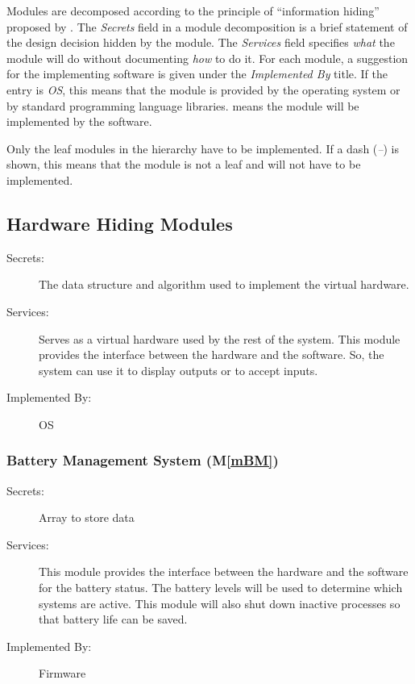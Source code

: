 \documentclass[12pt, titlepage]{article}
\newcommand{\mref}[1]{M\ref{#1}}
\begin{document}
Modules are decomposed according to the principle of ``information hiding''
proposed by \citet{ParnasEtAl1984}. The \emph{Secrets} field in a module
decomposition is a brief statement of the design decision hidden by the
module. The \emph{Services} field specifies \emph{what} the module will do
without documenting \emph{how} to do it. For each module, a suggestion for the
implementing software is given under the \emph{Implemented By} title. If the
entry is \emph{OS}, this means that the module is provided by the operating
system or by standard programming language libraries.  \emph{\progname{}} means the
module will be implemented by the \progname{} software.

Only the leaf modules in the hierarchy have to be implemented. If a dash
(\emph{--}) is shown, this means that the module is not a leaf and will not have
to be implemented.

\subsection{Hardware Hiding Modules}

\begin{description}
  \item[Secrets:]The data structure and algorithm used to implement the virtual
  hardware.
  \item[Services:]Serves as a virtual hardware used by the rest of the
  system. This module provides the interface between the hardware and the
  software. So, the system can use it to display outputs or to accept inputs.
  \item[Implemented By:] OS
\end{description}

\subsubsection{Battery Management System (\mref{mBM})}
\begin{description}
  \item[Secrets:] Array to store data
  \item[Services:] This module provides the interface between the hardware and the
    software for the battery status. The battery levels will be used to determine which systems are active. This module will also shut down inactive processes so that battery life can be saved.
  \item[Implemented By:] Firmware
\end{description}
\end{document}
